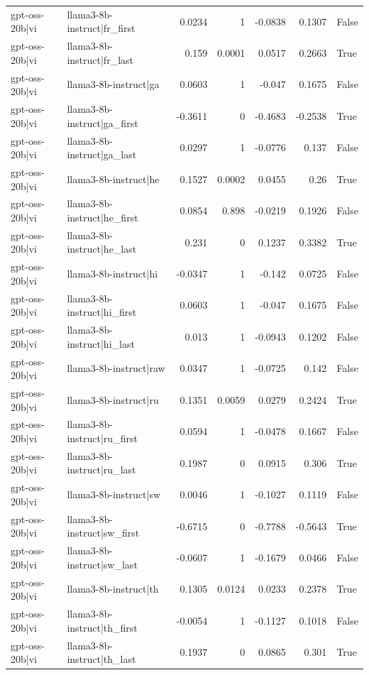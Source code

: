 \begin{table}
\begin{tabular}{l l r r r r l}
gpt-oss-20b|vi & llama3-8b-instruct|fr_first & 0.0234 & 1 & -0.0838 & 0.1307 & False \\
gpt-oss-20b|vi & llama3-8b-instruct|fr_last & 0.159 & 0.0001 & 0.0517 & 0.2663 & True \\
gpt-oss-20b|vi & llama3-8b-instruct|ga & 0.0603 & 1 & -0.047 & 0.1675 & False \\
gpt-oss-20b|vi & llama3-8b-instruct|ga_first & -0.3611 & 0 & -0.4683 & -0.2538 & True \\
gpt-oss-20b|vi & llama3-8b-instruct|ga_last & 0.0297 & 1 & -0.0776 & 0.137 & False \\
gpt-oss-20b|vi & llama3-8b-instruct|he & 0.1527 & 0.0002 & 0.0455 & 0.26 & True \\
gpt-oss-20b|vi & llama3-8b-instruct|he_first & 0.0854 & 0.898 & -0.0219 & 0.1926 & False \\
gpt-oss-20b|vi & llama3-8b-instruct|he_last & 0.231 & 0 & 0.1237 & 0.3382 & True \\
gpt-oss-20b|vi & llama3-8b-instruct|hi & -0.0347 & 1 & -0.142 & 0.0725 & False \\
gpt-oss-20b|vi & llama3-8b-instruct|hi_first & 0.0603 & 1 & -0.047 & 0.1675 & False \\
gpt-oss-20b|vi & llama3-8b-instruct|hi_last & 0.013 & 1 & -0.0943 & 0.1202 & False \\
gpt-oss-20b|vi & llama3-8b-instruct|raw & 0.0347 & 1 & -0.0725 & 0.142 & False \\
gpt-oss-20b|vi & llama3-8b-instruct|ru & 0.1351 & 0.0059 & 0.0279 & 0.2424 & True \\
gpt-oss-20b|vi & llama3-8b-instruct|ru_first & 0.0594 & 1 & -0.0478 & 0.1667 & False \\
gpt-oss-20b|vi & llama3-8b-instruct|ru_last & 0.1987 & 0 & 0.0915 & 0.306 & True \\
gpt-oss-20b|vi & llama3-8b-instruct|sw & 0.0046 & 1 & -0.1027 & 0.1119 & False \\
gpt-oss-20b|vi & llama3-8b-instruct|sw_first & -0.6715 & 0 & -0.7788 & -0.5643 & True \\
gpt-oss-20b|vi & llama3-8b-instruct|sw_last & -0.0607 & 1 & -0.1679 & 0.0466 & False \\
gpt-oss-20b|vi & llama3-8b-instruct|th & 0.1305 & 0.0124 & 0.0233 & 0.2378 & True \\
gpt-oss-20b|vi & llama3-8b-instruct|th_first & -0.0054 & 1 & -0.1127 & 0.1018 & False \\
gpt-oss-20b|vi & llama3-8b-instruct|th_last & 0.1937 & 0 & 0.0865 & 0.301 & True \\

\end{tabular}
\end{table}
